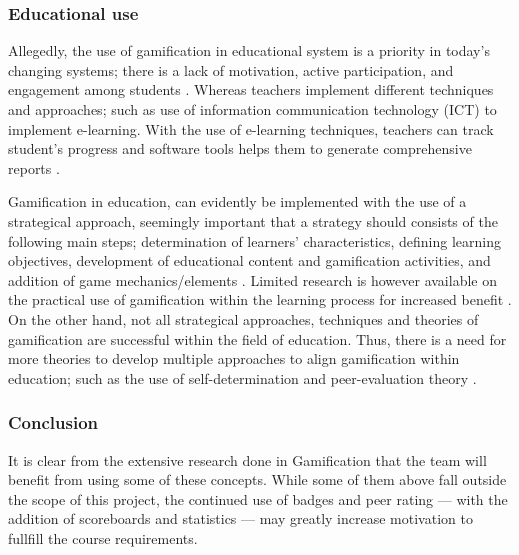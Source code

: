 \subsubsection{Educational use}
Allegedly, the use of gamification in educational system is a priority in today's changing systems; there is a lack of motivation, active participation, and engagement among students \cite{muntean2011raising}. Whereas teachers implement different techniques and approaches; such as use of information communication technology (ICT) to implement e-learning. With the use of e-learning techniques, teachers can track student's progress and software tools helps them to generate comprehensive reports \cite{deterding2012gamification, zichermann2011gamification, glover2013play}. \par \vspace{1.5mm}
Gamification in education, can evidently be implemented with the use of a strategical approach, seemingly important that a strategy should consists of the following main steps; determination of learners' characteristics, defining learning objectives, development of educational content and gamification activities, and addition of game mechanics/elements \cite{kiryakova2014gamification}. Limited research is however available on the practical use of gamification within the learning process for increased benefit \cite{kurshan2016gamification}. On the other hand, not all strategical approaches, techniques and theories of gamification are successful within the field of education. Thus, there is a need for more theories to develop multiple approaches to align gamification within education; such as the use of self-determination and peer-evaluation theory \cite{vanroy2017gamification}.

\subsubsection{Conclusion}
It is clear from the extensive research done in Gamification that the team will benefit from using some of these concepts. While some of them above fall outside the scope of this project, the continued use of badges and peer rating --- with the addition of scoreboards and statistics --- may greatly increase motivation to fullfill the course requirements.
